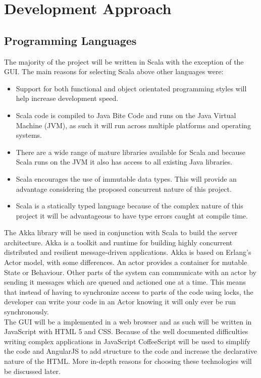 \chapter{Development Approach}

	\section{Programming Languages}
		The majority of the project will be written in Scala\cite{Scala} with the exception of the GUI. The main reasons for selecting Scala above other languages were:
		
		\begin{itemize}
			\item Support for both functional and object orientated programming styles will help increase development speed.
			\item Scala code is compiled to Java Bite Code and runs on the Java Virtual Machine (JVM), as such it will run across multiple platforms and operating systems.
			\item There are a wide range of mature libraries available for Scala and because Scala runs on the JVM it also has access to all existing Java libraries.
			\item Scala encourages the use of immutable data types. This will provide an advantage considering the proposed concurrent nature of this project.
			\item Scala is a statically typed language because of the complex nature of this project it will be advantageous to have type errors caught at compile time.
		\end{itemize}
			
		The Akka library will be used in conjunction with Scala to build the server architecture. Akka is a toolkit and runtime for building highly concurrent distributed and resilient message-driven applications\cite{Akka}. Akka is based on Erlang's Actor model, with some differences\cite{AkkaVsErlang}. An actor provides a container for mutable State or Behaviour. Other parts of the system can communicate with an actor by sending it messages which are queued and actioned one at a time. This means that instead of having to synchronize access to parts of the code using locks, the developer can write your code in an Actor knowing it will only ever be run synchronously\cite{AkkaActors}.\\
		
		The GUI will be a implemented in a web browser and as such will be written in JavaScript with HTML 5 and CSS. Because of the well documented difficulties writing complex applications in JavaScript\cite{JavaScriptProblem} CoffeeScript will be used to simplify the code and AngularJS to add structure to the code and increase the declarative nature of the HTML. More in-depth reasons for choosing these technologies will be discussed later.
	

